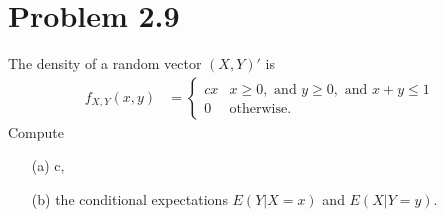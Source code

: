 \documentclass[10pt,a4paper]{article}
\theoremstyle{theorem}
\theoremstyle{definition}
\begin{document}
\section*{Problem 2.9}
The density of a random vector $(X, Y)'$ is 
\begin{align*}
f_{X, Y}(x, y) &= \begin{cases} 
      cx & x \geq 0, \text{ and } y \geq 0, \text{ and } x + y \leq 1 \\
      0 & \text{otherwise.}
   \end{cases}
\end{align*}
Compute 
\begin{enumerate}
\item[(a)] c,
\item[(b)] the conditional expectations $E(Y | X = x)$ and $E(X| Y = y)$.
\end{enumerate}
\end{document}
